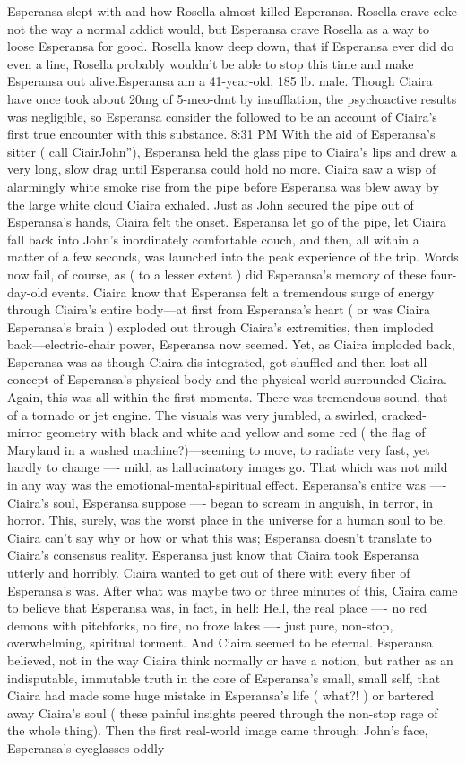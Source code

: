 \documentclass[12pt]{book}
\begin{document}
Esperansa slept with and how Rosella almost killed Esperansa. Rosella crave coke not the way a normal addict would, but Esperansa crave Rosella as a way to loose Esperansa for good. Rosella know deep down, that if Esperansa ever did do even a line, Rosella probably wouldn't be able to stop this time and make Esperansa out alive.Esperansa am a 41-year-old, 185 lb. male. Though Ciaira have once took about 20mg of 5-meo-dmt by insufflation, the psychoactive results was negligible, so Esperansa consider the followed to be an account of Ciaira's first true encounter with this substance. 8:31 PM With the aid of Esperansa's sitter ( call CiairJohn''), Esperansa held the glass pipe to Ciaira's lips and drew a very long, slow drag until Esperansa could hold no more. Ciaira saw a wisp of alarmingly white smoke rise from the pipe before Esperansa was blew away by the large white cloud Ciaira exhaled. Just as John secured the pipe out of Esperansa's hands, Ciaira felt the onset. Esperansa let go of the pipe, let Ciaira fall back into John's inordinately comfortable couch, and then, all within a matter of a few seconds, was launched into the peak experience of the trip. Words now fail, of course, as ( to a lesser extent ) did Esperansa's memory of these four-day-old events. Ciaira know that Esperansa felt a tremendous surge of energy through Ciaira's entire body---at first from Esperansa's heart ( or was Ciaira Esperansa's brain ) exploded out through Ciaira's extremities, then imploded back---electric-chair power, Esperansa now seemed. Yet, as Ciaira imploded back, Esperansa was as though Ciaira dis-integrated, got shuffled and then lost all concept of Esperansa's physical body and the physical world surrounded Ciaira. Again, this was all within the first moments. There was tremendous sound, that of a tornado or jet engine. The visuals was very jumbled, a swirled, cracked-mirror geometry with black and white and yellow and some red ( the flag of Maryland in a washed machine?)---seeming to move, to radiate very fast, yet hardly to change ---- mild, as hallucinatory images go. That which was not mild in any way was the emotional-mental-spiritual effect. Esperansa's entire was ---- Ciaira's soul, Esperansa suppose ---- began to scream in anguish, in terror, in horror. This, surely, was the worst place in the universe for a human soul to be. Ciaira can't say why or how or what this was; Esperansa doesn't translate to Ciaira's consensus reality. Esperansa just know that Ciaira took Esperansa utterly and horribly. Ciaira wanted to get out of there with every fiber of Esperansa's was. After what was maybe two or three minutes of this, Ciaira came to believe that Esperansa was, in fact, in hell: Hell, the real place ---- no red demons with pitchforks, no fire, no froze lakes ---- just pure, non-stop, overwhelming, spiritual torment. And Ciaira seemed to be eternal. Esperansa believed, not in the way Ciaira think normally or have a notion, but rather as an indisputable, immutable truth in the core of Esperansa's small, small self, that Ciaira had made some huge mistake in Esperansa's life ( what?! ) or bartered away Ciaira's soul ( these painful insights peered through the non-stop rage of the whole thing). Then the first real-world image came through: John's face, Esperansa's eyeglasses oddly 
\end{document}

